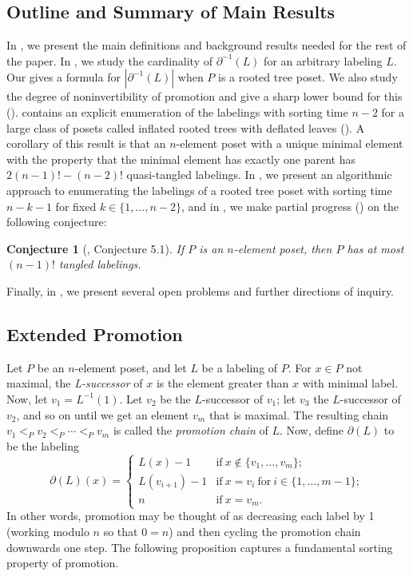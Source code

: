 \documentclass[11pt]{amsart}
\newtheorem{conjecture}[thm]{Conjecture}
\theoremstyle{definition}
\newcommand{\inverse}{^{-1}}
\begin{document}
\subsection{Outline and Summary of Main Results}
In , we present the main definitions and background results needed for the rest of the paper. In , we study the cardinality of $ \partial\inverse(L) $ for an arbitrary labeling $ L $. Our  gives a formula for $ |\partial\inverse(L)| $ when $ P $ is a rooted tree poset. We also study the {degree of noninvertibility} of promotion and give a sharp lower bound for this ().  contains an explicit enumeration of the labelings with sorting time $ n-2 $ for a large class of posets called {inflated rooted trees with deflated leaves} (). A corollary of this result is that an $ n $-element poset with a unique minimal element with the property that the minimal element has exactly one parent has $ 2(n-1)!-(n-2)! $ quasi-tangled labelings. In , we present an algorithmic approach to enumerating the labelings of a rooted tree poset with sorting time $ n-k-1 $ for fixed $ k\in\{1,\ldots,n-2\} $, and in , we make partial progress () on the following conjecture:
\begin{conjecture}[\cite{DK20}, Conjecture 5.1]\label{conj: (n-1)!}
	If $ P $ is an $ n $-element poset, then $ P $ has at most $ (n-1)! $ tangled labelings. 
\end{conjecture} \noindent Finally, in , we present several open problems and further directions of inquiry.

\subsection{Extended Promotion}
Let $ P $ be an $ n $-element poset, and let $ L $ be a labeling of $ P $. For $ x\in P $ not maximal, the \emph{L-successor} of $ x $ is the element greater than $ x $ with minimal label. Now, let $ v_1=L\inverse(1) $. Let $ v_2 $ be the $ L $-successor of $ v_1 $; let $ v_3 $ the $ L $-successor of $ v_2 $, and so on until we get an element $ v_m $ that is maximal. The resulting chain $ v_1<_Pv_2<_P\cdots<_Pv_m $ is called the \emph{promotion chain} of $ L $. Now, define $ \partial(L) $ to be the labeling \[\partial(L)(x)=\begin{cases}
	L(x)-1 & \mathrm{if\ }x\not\in\{v_1,\ldots,v_m\};\\
	L(v_{i+1})-1 & \mathrm{if\ }x=v_i\ \mathrm{for\ }i\in\{1,\ldots,m-1\};\\
	n & \mathrm{if\ }x=v_m.
\end{cases}\] In other words, promotion may be thought of as decreasing each label by 1 (working modulo $ n $ so that $ 0=n $) and then cycling the promotion chain downwards one step. The following proposition captures a fundamental sorting property of promotion.
\end{document}
